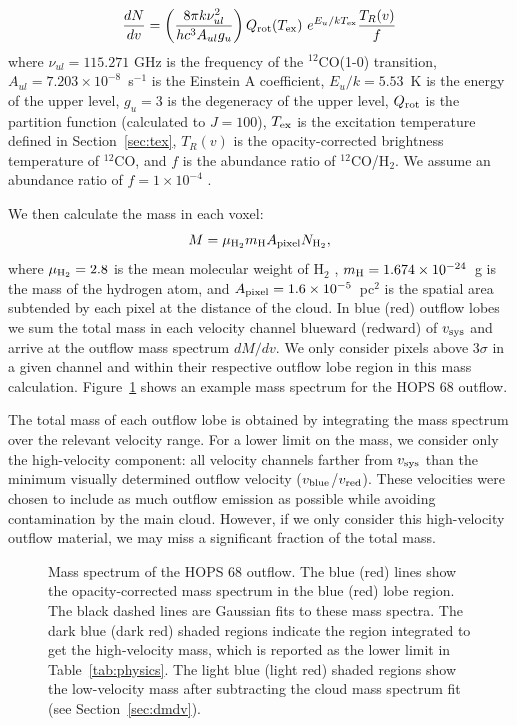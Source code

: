 \documentclass[twocolumn]{aastex63}
\newcommand{\example}{HOPS 68}
\newcommand{\co}[1][]{\ensuremath{^{#1}}CO}
\begin{document}
\begin{equation}\label{eq:dNdv}
\frac{dN}{dv} = \left(\frac{8\pi k \nu^2_{ul}}{h c^3 A_{ul} g_u}\right) Q_{\rm rot}(T_{\rm ex})~ e^{E_u / kT_{\rm ex}} \frac{T_R(v)}{f}
\end{equation}
where $\nu_{ul} = 115.271$ GHz is the frequency of the \co[12](1-0) transition, $A_{ul} = 7.203 \times 10^{-8}$~s$^{-1}$ is the Einstein A coefficient, $E_u/k = 5.53$~K is the energy of the upper level, $g_u = 3$ is the degeneracy of the upper level, $Q_{\rm rot}$ is the partition function (calculated to $J=100$), $T_{\rm ex}$ is the excitation temperature defined in Section~\ref{sec:tex}, $T_R(v)$ is the opacity-corrected brightness temperature of \co[12]{}, and $f$ is the abundance ratio of 
\co[12]/H$_{2}$. We assume an abundance ratio of $f = 1 \times 10 ^{-4}$ \citep{Frerking82}.

We then calculate the mass in each voxel:
\begin{equation}\label{eq:mass}
M = \mu_{\rm H_2} m_{\rm H} A_{\rm pixel} N_{\rm H_2},
\end{equation}
where $\mu_{\rm H_2} = 2.8$ is the mean molecular weight of H$_2$ \citep{Kauffmann08}, $m_{\rm H} = 1.674 \times 10^{-24}$~g is the mass of the hydrogen atom, and $A_{\rm pixel} = 1.6 \times 10^{-5}$~pc$^2$ is the spatial area subtended by each pixel at the distance of the cloud. In blue (red) outflow lobes we sum the total mass in each velocity channel blueward (redward) of $v_{\rm sys}$ and arrive at the outflow mass spectrum $dM/dv$. We only consider pixels above $3\sigma$ in a given channel and within their respective outflow lobe region in this mass calculation. Figure~\ref{fig:dmdv} shows an example mass spectrum for the \example{} outflow.

The total mass of each outflow lobe is obtained by integrating the mass spectrum over the relevant velocity range. For a lower limit on the mass, we consider only the high-velocity component: all velocity channels farther from $v_{\rm sys}$ than the minimum visually determined outflow velocity ($v_{\rm blue}$/$v_{\rm red}$). These velocities were chosen to include as much outflow emission as possible while avoiding contamination by the main cloud. However, if we only consider this high-velocity outflow material, we may miss a significant fraction of the total mass.

\begin{figure}
\caption{Mass spectrum of the \example{} outflow. The blue (red) lines show the opacity-corrected mass spectrum in the blue (red) lobe region. The black dashed lines are Gaussian fits to these mass spectra. The dark blue (dark red) shaded regions indicate the region integrated to get the high-velocity mass, which is reported as the lower limit in Table~\ref{tab:physics}. The light blue (light red) shaded regions show the low-velocity mass after subtracting the cloud mass spectrum fit (see Section~\ref{sec:dmdv}).\label{fig:dmdv}}
\end{figure}
\end{document}
